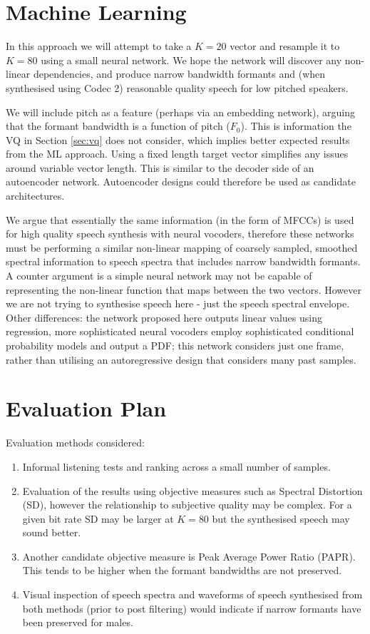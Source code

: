 \documentclass{article}
\begin{document}
\section{Machine Learning}

In this approach we will attempt to take a $K=20$ vector and resample it to $K=80$ using a small neural network.   We hope the network will discover any non-linear dependencies, and produce narrow bandwidth formants and (when synthesised using Codec 2) reasonable quality speech for low pitched speakers.  

We will include pitch as a feature (perhaps via an embedding network), arguing that the formant bandwidth is a function of pitch ($F_0$).  This is information the VQ in Section \ref{sec:vq} does not consider, which implies better expected results from the ML approach. Using a fixed length target vector simplifies any issues around variable vector length.  This is similar to the decoder side of an autoencoder network.  Autoencoder designs could therefore be used as candidate architectures.

We argue that essentially the same information (in the form of MFCCs) is used for high quality speech synthesis with neural vocoders, therefore these networks must be performing a similar non-linear mapping of coarsely sampled, smoothed spectral information to speech spectra that includes narrow bandwidth formants.  A counter argument is a simple neural network may not be capable of representing the non-linear function that maps between the two vectors.  However we are not trying to synthesise speech here - just the speech spectral envelope.  Other differences: the network proposed here outputs linear values using regression, more sophisticated neural vocoders employ sophisticated conditional probability models and output a PDF; this network considers just one frame, rather than utilising an autoregressive design that considers many past samples.

\section{Evaluation Plan}

Evaluation methods considered:
\begin{enumerate}
\item Informal listening tests and ranking across a small number of samples.
\item Evaluation of the results using objective measures such as Spectral Distortion (SD), however the relationship to subjective quality may be complex.  For a given bit rate SD may be larger at $K=80$ but the synthesised speech may sound better.
\item Another candidate objective measure is Peak Average Power Ratio (PAPR). This tends to be higher when the formant bandwidths are not preserved.
\item Visual inspection of speech spectra and waveforms of speech synthesised from both methods (prior to post filtering) would indicate if narrow formants have been preserved for males.
\end{enumerate}
	
\end{document}
